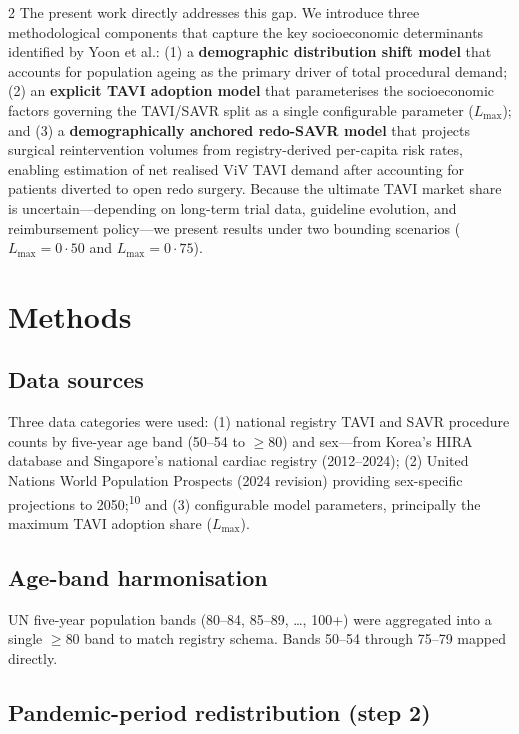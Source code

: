 \documentclass[10pt, a4paper]{article}
\begin{document}
\begin{multicols}{2}
The present work directly addresses this gap. We introduce three methodological components that capture the key socioeconomic determinants identified by Yoon et al.: (1) a \textbf{demographic distribution shift model} that accounts for population ageing as the primary driver of total procedural demand; (2) an \textbf{explicit TAVI adoption model} that parameterises the socioeconomic factors governing the TAVI/SAVR split as a single configurable parameter ($L_{\max}$); and (3) a \textbf{demographically anchored redo-SAVR model} that projects surgical reintervention volumes from registry-derived per-capita risk rates, enabling estimation of net realised ViV TAVI demand after accounting for patients diverted to open redo surgery. Because the ultimate TAVI market share is uncertain---depending on long-term trial data, guideline evolution, and reimbursement policy---we present results under two bounding scenarios ($L_{\max} = 0{\cdot}50$ and $L_{\max} = 0{\cdot}75$).


\section{Methods}

\subsection{Data sources}

Three data categories were used: (1) national registry TAVI and SAVR procedure counts by five-year age band (50--54 to $\geq$80) and sex---from Korea's HIRA database and Singapore's national cardiac registry (2012--2024); (2) United Nations World Population Prospects (2024 revision) providing sex-specific projections to 2050;\textsuperscript{10} and (3) configurable model parameters, principally the maximum TAVI adoption share ($L_{\max}$).

\subsection{Age-band harmonisation}

UN five-year population bands (80--84, 85--89, \ldots, 100+) were aggregated into a single $\geq$80 band to match registry schema. Bands 50--54 through 75--79 mapped directly.

\subsection{Pandemic-period redistribution (step 2)}


\end{multicols}
\end{document}
